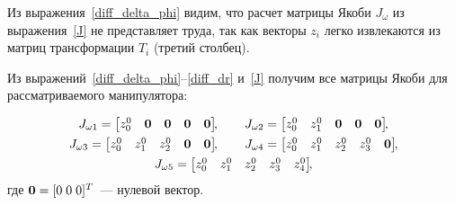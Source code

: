 Из выражения~\eqref{diff_delta_phi} видим, что расчет матрицы Якоби $ J_\omega $ из выражения~\eqref{J} не представляет труда, так как векторы $ z_i $ легко извлекаются из матриц трансформации $ T_i $ (третий столбец).


Из выражений~\eqref{diff_delta_phi}--\eqref{diff_dr} и~\eqref{J} получим все матрицы Якоби для рассматриваемого манипулятора:

\begin{gather*}
	J_{\omega 1} =
	\begin{bmatrix}
		z^0_0 & \nv & \nv & \nv & \nv
	\end{bmatrix}\!\!,
	\qquad
	J_{\omega 2} =
	\begin{bmatrix}
		z^0_0 & z^0_1 & \nv & \nv & \nv
	\end{bmatrix}\!\!,
	\\
	J_{\omega 3} =
	\begin{bmatrix}
		z^0_0 & z^0_1 & z^0_2 & \nv & \nv
	\end{bmatrix}\!\!,
	\qquad
	J_{\omega 4} =
	\begin{bmatrix}
		z^0_0 & z^0_1 & z^0_2 & z^0_3 & \nv
	\end{bmatrix}\!\!,
	\\
	J_{\omega 5} =
	\begin{bmatrix}
		z^0_0 & z^0_1 & z^0_2 & z^0_3 & z^0_4
	\end{bmatrix}\!\!,
\end{gather*}
где $\mathbf0 = [0\;0\;0]^T$~--- нулевой вектор.

